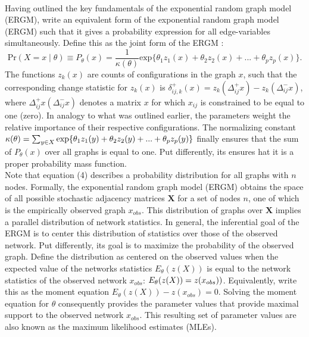 \documentclass[a4paper, man]{apa6}
\begin{document}
\\
Having outlined the key fundamentals of the exponential random graph model (ERGM), write an equivalent form of the exponential random graph model (ERGM) such that it gives a probability expression for all edge-variables simultaneously. Define this as the joint form of the ERGM : \begin{equation} \text{Pr}(X = x \mid \theta) \equiv P_{\theta}(x) = \frac{1}{\kappa(\theta)}\text{exp}\{\theta_{1}z_{1}(x) + \theta_{2}z_{2}(x) + ... + \theta_{p}z_{p}(x)\}. \end{equation} The functions $z_{k}(x)$ are counts of configurations in the graph $x$, such that the corresponding change statistic for $z_{k}(x)$ is $\delta_{ij, k}^{+}(x) = z_{k}(\Delta_{ij}^{+}x) − z_{k}(\Delta_{ij}^{-}x)$, where $\Delta_{ij}^{+}x(\Delta_{ij}^{-}x)$ denotes a matrix $x$ for which $x_{ij}$ is constrained to be equal to one (zero). In analogy to what was outlined earlier, the parameters weight the relative importance of their respective configurations. The normalizing constant $\kappa(\theta) = \sum_{y \in X} \text{exp}\{\theta_{1}z_{1}(y) + \\ \noindent \theta_{2}z_{2}(y)+ ... + \theta_{p}z_{p}(y)\}$ finally ensures that the sum of $P_{\theta}(x)$ over all graphs is equal to one. Put differently, its ensures hat it is a proper probability mass function. 
\\
Note that equation (4) describes a probability distribution for all graphs with $n$ nodes. Formally, the exponential random graph model (ERGM) obtains the space of all possible stochastic adjacency matrices $\textbf{X}$ for a set of nodes $n$, one of which is the empirically observed graph $x_{obs}$. This distribution of graphs over $\textbf{X}$ implies a parallel distribution of network statistics. In general, the inferential goal of the ERGM is to center this distribution of statistics over those of the observed network. Put differently, its goal is to maximize the probability of the observed graph. Define the distribution as centered on the observed values when the expected value of the networks statistics $E_{\theta}(z(X))$ is equal to the network statistics of the observed network $x_{obs}$: $E_{\theta}(z(X)) = \\ \noindent z(x_{obs}))$. Equivalently, write this as the moment equation $E_{\theta}(z(X)) − z(x_{obs}) = 0$. Solving the moment equation for $\theta$ consequently provides the parameter values that provide maximal support to the observed network $x_{obs}$. \clearpage \noindent This resulting set of parameter values are also known as the maximum likelihood estimates (MLEs). 
\end{document}
